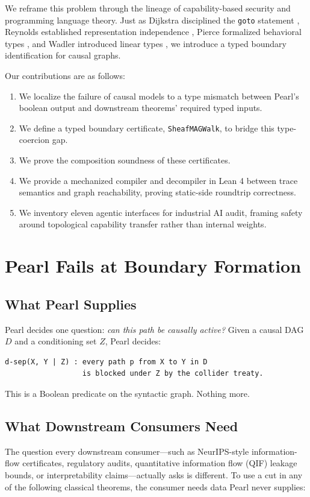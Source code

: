 \documentclass[acmsmall,screen,nonacm]{acmart}
\newcommand{\lean}[1]{\lstinline!#1!}
\begin{document}
We reframe this problem through the lineage of capability-based security and programming language theory. Just as Dijkstra disciplined the \texttt{goto} statement \cite{dijkstra1968goto}, Reynolds established representation independence \cite{reynolds1983types}, Pierce formalized behavioral types \cite{pierce2002types}, and Wadler introduced linear types \cite{wadler1990linear}, we introduce a typed boundary identification for causal graphs.

Our contributions are as follows:
\begin{enumerate}
    \item We localize the failure of causal models to a type mismatch between Pearl's boolean output and downstream theorems' required typed inputs.
    \item We define a typed boundary certificate, \lean{SheafMAGWalk}, to bridge this type-coercion gap.
    \item We prove the composition soundness of these certificates.
    \item We provide a mechanized compiler and decompiler in Lean 4 between trace semantics and graph reachability, proving static-side roundtrip correctness.
    \item We inventory eleven agentic interfaces for industrial AI audit, framing safety around topological capability transfer rather than internal weights.
\end{enumerate}

\section{Pearl Fails at Boundary Formation}\label{sec:boundary}

\subsection{What Pearl Supplies}
Pearl decides one question: \emph{can this path be causally active?} Given a causal DAG $D$ and a conditioning set $Z$, Pearl decides:
\begin{lstlisting}
d-sep(X, Y | Z) : every path p from X to Y in D
                  is blocked under Z by the collider treaty.
\end{lstlisting}
This is a Boolean predicate on the syntactic graph. Nothing more.

\subsection{What Downstream Consumers Need}
The question every downstream consumer---such as NeurIPS-style information-flow certificates, regulatory audits, quantitative information flow (QIF) leakage bounds, or interpretability claims---actually asks is different. To use a cut in any of the following classical theorems, the consumer needs data Pearl never supplies:
\end{document}
